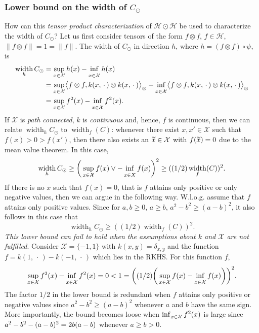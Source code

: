 \documentclass[AHL,Unicode,longabstracts,published]{cedram}
\theoremstyle{remark}
\DeclareMathOperator*{\infd}{inf\vphantom{p}}
\DeclareMathOperator{\diam}{width}
\newcommand{\X}{\mathcal{X}}
\newcommand{\cH}{\mathcal{H}}
\let\oldtilde\tilde
\renewcommand*{\tilde}[1]{\mathchoice{\widetilde{#1}}{\widetilde{#1}}{\oldtilde{#1}}{\oldtilde{#1}}}
\let\originalleft\left
\let\originalright\right
\renewcommand{\left}{\mathopen{}\mathclose\bgroup\originalleft}
\renewcommand{\right}{\aftergroup\egroup\originalright}
\begin{document}
\subsubsection{Lower bound on the width of \texorpdfstring{$C_\odot$}{C\_ odot}} How can this \emph{tensor product characterization} of $\cH \odot \cH$ be used to characterize the width of $C_\odot$? Let us first consider tensors of the form $f\otimes f$, $f\in \cH$, $\|f \otimes f\| = 1 = \|f\|$. The width of $C_\odot$ in direction $h$, where $h = (f \otimes f) \circ \psi$, is
\begin{align*}
\diam_{h} C_\odot &= \sup_{x\in \X} h(x) - \infd_{x\in \X} h(x) \\
&= \sup_{x\in \X} \bigl\langle f \otimes f, k(x,\,\cdot\,) \otimes k(x,\,\cdot\,) \bigr\rangle_\otimes - \infd_{x\in \X} \bigl\langle f\otimes f, k(x,\,\cdot\,) \otimes k(x,\,\cdot\,) \bigr\rangle_\otimes \\
&= \sup_{x\in \X} f^2(x) - \infd_{x\in \X} f^2(x).
\end{align*}
If $\X$ is \emph{path connected}, $k$ is \emph{continuous} and, hence, $f$ is continuous, then we can relate $\diam_h C_\odot$ to $\diam_f(C)$: whenever there exist $x,x' \in \X$ such that $f(x) > 0 > f(x')$, then there also exists an $\tilde x \in \X$ with $f(\tilde x) = 0$ due to the mean value theorem. In this case,
\[
\diam_{h} C_\odot \geq \left(\,\sup_{x \in \X} f(x) \vee - \infd_{x\in X} f(x)\right)^2 \geq ((1/2) \diam_f(C))^2.
\]
If there is no $x$ such that $f(x) =0$, that is $f$ attains only positive or only negative values, then we can argue in the following way. W.l.o.g. assume that $f$ attains only positive values. Since for $a,b \geq 0$, $a \geq b$, $a^2 - b^2 \geq (a-b)^2$, it also follows in this case that
\begin{equation*}
\diam_{h} C_\odot \geq ((1/2) \diam_f(C))^2.
\end{equation*}
\emph{This lower bound can fail to hold when the assumptions about $k$ and $\X$ are not fulfilled}. Consider $\X = \{-1,1\}$ with $k(x,y) = \delta_{x,y}$ and the function $f = k(1,\,\cdot\,) - k(-1,\,\cdot\,)$ which lies in the RKHS. For this function $f$,
\[
\sup_{x\in \X} f^2(x) - \infd_{x \in \X} f^2(x) = 0 < 1 = \left((1/2) \left(\,\sup_{x\in \X} f(x) - \infd_{x\in \X} f(x)\right)\right)^2.
\]
The factor $1/2$ in the lower bound is redundant when $f$ attains only positive or negative values since $a^2 - b^2 \geq (a-b)^2$ whenever $a$ and $b$ have the same sign. More importantly, the bound becomes loose when $\infd_{x\in \X} f^2(x)$ is large since $a^2 - b^2 -\linebreak (a-b)^2 = 2b (a-b)$ whenever $a \geq b > 0$.
\end{document}
